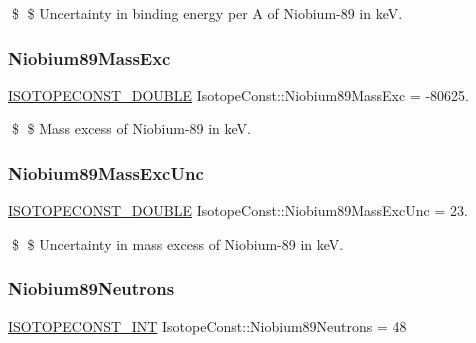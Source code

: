 \$ \$ Uncertainty in binding energy per A of Niobium-\/89 in keV. \mbox{\label{group___isotope_const-_niobium-_nb89_ga158dfd02df3d941cd405e7bb4d2d820f}} 
\subsubsection{\texorpdfstring{Niobium89\+Mass\+Exc}{Niobium89MassExc}}
{\footnotesize\ttfamily \mbox{\hyperlink{group___isotope_const-_macros_ga8f45a7272ce02c0b4c65c44636ed719a}{I\+S\+O\+T\+O\+P\+E\+C\+O\+N\+S\+T\+\_\+\+D\+O\+U\+B\+LE}} Isotope\+Const\+::\+Niobium89\+Mass\+Exc = -\/80625.}

\$ \$ Mass excess of Niobium-\/89 in keV. \mbox{\label{group___isotope_const-_niobium-_nb89_ga6b990b7b34a89d8ebe2e2313716e3b0d}} 
\subsubsection{\texorpdfstring{Niobium89\+Mass\+Exc\+Unc}{Niobium89MassExcUnc}}
{\footnotesize\ttfamily \mbox{\hyperlink{group___isotope_const-_macros_ga8f45a7272ce02c0b4c65c44636ed719a}{I\+S\+O\+T\+O\+P\+E\+C\+O\+N\+S\+T\+\_\+\+D\+O\+U\+B\+LE}} Isotope\+Const\+::\+Niobium89\+Mass\+Exc\+Unc = 23.}

\$ \$ Uncertainty in mass excess of Niobium-\/89 in keV. \mbox{\label{group___isotope_const-_niobium-_nb89_ga1433e1299df4a247e7d8c7aec87c7939}} 
\subsubsection{\texorpdfstring{Niobium89\+Neutrons}{Niobium89Neutrons}}
{\footnotesize\ttfamily \mbox{\hyperlink{group___isotope_const-_macros_ga5f18360b3e99483a35c32d789e62621c}{I\+S\+O\+T\+O\+P\+E\+C\+O\+N\+S\+T\+\_\+\+I\+NT}} Isotope\+Const\+::\+Niobium89\+Neutrons = 48}

